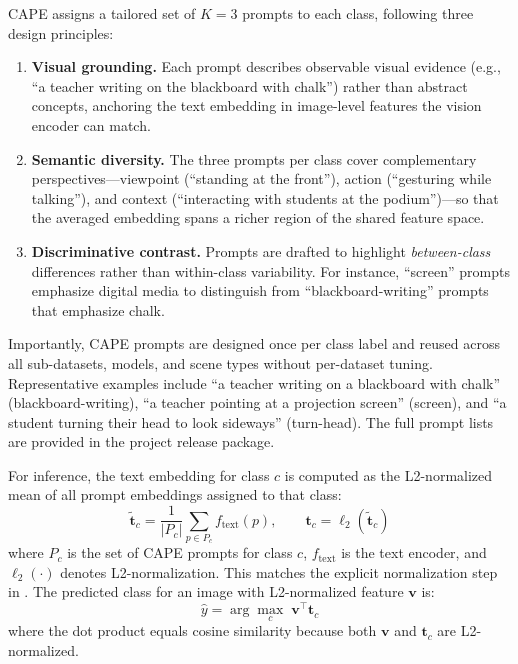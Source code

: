 \documentclass[symmetry,article,submit,pdftex,moreauthors]{Definitions/mdpi}
\begin{document}
CAPE assigns a tailored set of $K=3$ prompts to each class, following three design principles:
\begin{enumerate}
    \item \textbf{Visual grounding.} Each prompt describes observable visual evidence (e.g., ``a teacher writing on the blackboard with chalk'') rather than abstract concepts, anchoring the text embedding in image-level features the vision encoder can match.
    \item \textbf{Semantic diversity.} The three prompts per class cover complementary perspectives---viewpoint (``standing at the front''), action (``gesturing while talking''), and context (``interacting with students at the podium'')---so that the averaged embedding spans a richer region of the shared feature space.
    \item \textbf{Discriminative contrast.} Prompts are drafted to highlight \emph{between-class} differences rather than within-class variability. For instance, ``screen'' prompts emphasize digital media to distinguish from ``blackboard-writing'' prompts that emphasize chalk.
\end{enumerate}
Importantly, CAPE prompts are designed once per class label and reused across all sub-datasets, models, and scene types without per-dataset tuning.
Representative examples include ``a teacher writing on a blackboard with chalk'' (blackboard-writing), ``a teacher pointing at a projection screen'' (screen), and ``a student turning their head to look sideways'' (turn-head). The full prompt lists are provided in the project release package.

For inference, the text embedding for class $c$ is computed as the L2-normalized mean of all prompt embeddings assigned to that class:
\begin{equation}
\tilde{\mathbf{t}}_c = \frac{1}{|P_c|} \sum_{p \in P_c} f_{\text{text}}(p), \qquad \mathbf{t}_c = \ell_2(\tilde{\mathbf{t}}_c)
\end{equation}
where $P_c$ is the set of CAPE prompts for class $c$, $f_{\text{text}}$ is the text encoder, and $\ell_2(\cdot)$ denotes L2-normalization. This matches the explicit normalization step in .
The predicted class for an image with L2-normalized feature $\mathbf{v}$ is:
\begin{equation}
\hat{y} = \arg\max_{c} \; \mathbf{v}^{\!\top} \mathbf{t}_c
\end{equation}
where the dot product equals cosine similarity because both $\mathbf{v}$ and $\mathbf{t}_c$ are L2-normalized.
\end{document}
